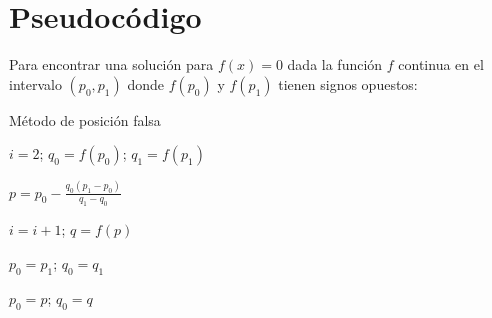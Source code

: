 \section{Pseudocódigo}

Para encontrar una solución para $ f(x) = 0 $ dada la función $ f $ continua en el intervalo $ (p_0, p_1) $ donde $ f(p_0) $ y $ f(p_1) $ tienen signos opuestos:

\begin{algorithm}
    \caption{Método de posición falsa}
    
    $ i = 2 $; $ q_0 = f(p_0) $; $ q_1 = f(p_1) $
    
    \BlankLine
    
     {
        $ p = p_0 - \frac{q_0 (p_1 - p_0)}{q_1 - q_0} $
        
        \BlankLine
        
         {
            }
        
        \BlankLine
        
        $ i = i + 1 $; $ q = f(p) $
        \BlankLine
        
         {
                $ p_0 = p_1 $; $ q_0 = q_1 $
            }
            
        \BlankLine
        
        $ p_0 = p $; $ q_0 = q $
    }
    
\end{algorithm}
